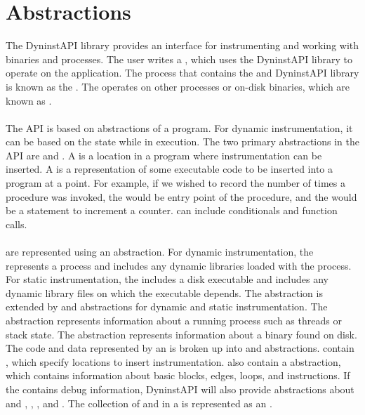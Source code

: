 \section{Abstractions}\label{sec:abstraction}
The DyninstAPI library provides an interface for instrumenting and working with binaries and processes.  The user writes a \mutator, which uses the DyninstAPI library to operate on the application.  The process that contains the \mutator and DyninstAPI library is known as the \mutatorprocess.  The \mutatorprocess  operates on other processes or on-disk binaries, which are known as \mutatees.\\\\   
The API is based on abstractions of a program.  For dynamic instrumentation, it can be based on the state while in execution.  The two primary abstractions in the API are \points and \snippets.  A \point is a location in a program where instrumentation can be inserted.  A \snippet is a representation of some executable code to be inserted into a program at a point.  For example, if we wished to record the number of times a procedure was invoked, the \point would be entry point of the procedure, and the \snippets would be a statement to increment a counter.  \Snippets can include conditionals and function calls.\\\\

\Mutatees are represented using an \addressspace abstraction.  For dynamic instrumentation, the \addressspace represents a process and includes any dynamic libraries loaded with the process. For static instrumentation, the \addressspace includes a disk executable and includes any dynamic library files on which the executable depends.  The \addressspace abstraction is extended by \process and \binary abstractions for dynamic and static instrumentation.  The \process abstraction represents information about a running process such as threads or stack state.  The \binary abstraction represents information about a binary found on disk.\\

The code and data represented by an \addressspace is broken up into \function and \variable abstractions.  \Functions contain \points, which specify locations to insert instrumentation.  \Functions also contain a \controlflowgraph abstraction, which contains information about basic blocks, edges, loops, and instructions.  If the \mutatee contains debug information, DyninstAPI will also provide abstractions about \variable and \function \types, \localvariables, \functionparameters, and \sourcecodelineinformation.  The collection of \functions and \variables in a \mutatee is represented as an \image.\\\\

